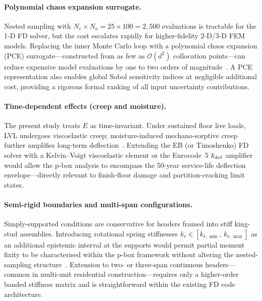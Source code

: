 \documentclass[10pt,twocolumn]{article}
\begin{document}
\paragraph{Polynomial chaos expansion surrogate.}
Nested sampling with $N_e \times N_a = 25 \times 100 = 2{,}500$
evaluations is tractable for the 1-D FD solver, but the cost escalates
rapidly for higher-fidelity 2-D/3-D FEM models.
Replacing the inner Monte Carlo loop with a polynomial chaos expansion
(PCE) surrogate---constructed from as few as $\mathcal{O}(d^2)$
collocation points---can reduce expensive model evaluations by one
to two orders of magnitude~\cite{novak2018,lim2023}.
A PCE representation also enables global Sobol sensitivity indices at
negligible additional cost, providing a rigorous formal ranking of all
input uncertainty contributions.

\paragraph{Time-dependent effects (creep and moisture).}
The present study treats $E$ as time-invariant.
Under sustained floor live loads, LVL undergoes viscoelastic creep;
moisture-induced mechano-sorptive creep further amplifies long-term
deflection~\cite{musselman2018,granello2019}.
Extending the EB (or Timoshenko) FD solver with a Kelvin--Voigt
viscoelastic element or the Eurocode~5 $k_{\rm def}$ amplifier
would allow the p-box analysis to encompass the 50-year
service-life deflection envelope---directly relevant to finish-floor
damage and partition-cracking limit states.

\paragraph{Semi-rigid boundaries and multi-span configurations.}
Simply-supported conditions are conservative for headers framed into
stiff king-stud assemblies.
Introducing rotational spring stiffnesses
$k_r \in [k_{r,\min},\,k_{r,\max}]$ as an additional epistemic
interval at the supports would permit partial moment fixity to be
characterised within the p-box framework without altering the
nested-sampling structure~\cite{jiang2018}.
Extension to two- or three-span continuous headers---common in
multi-unit residential construction---requires only a higher-order
banded stiffness matrix and is straightforward within the existing
FD code architecture.
\end{document}

